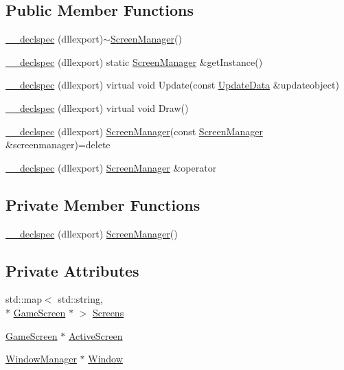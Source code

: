 \subsection*{Public Member Functions}
\begin{DoxyCompactItemize}
\item 
\hyperlink{class_screen_manager_ab348f37f1c0e6324ce57c4fbd3ec7472}{\-\_\-\-\_\-declspec} (dllexport)$\sim$\hyperlink{class_screen_manager}{Screen\-Manager}()
\item 
\hyperlink{class_screen_manager_a4c3f75679b3012b277a7d27413976ddd}{\-\_\-\-\_\-declspec} (dllexport) static \hyperlink{class_screen_manager}{Screen\-Manager} \&get\-Instance()
\item 
\hyperlink{class_screen_manager_a35e85f470e82fa773c250b1e67d1ad1b}{\-\_\-\-\_\-declspec} (dllexport) virtual void Update(const \hyperlink{class_update_data}{Update\-Data} \&updateobject)
\item 
\hyperlink{class_screen_manager_a21d7d26d0b547930bc87e3f4beb3c64c}{\-\_\-\-\_\-declspec} (dllexport) virtual void Draw()
\item 
\hyperlink{class_screen_manager_aa58378c4491afb6d72f4bc0b5090515f}{\-\_\-\-\_\-declspec} (dllexport) \hyperlink{class_screen_manager}{Screen\-Manager}(const \hyperlink{class_screen_manager}{Screen\-Manager} \&screenmanager)=delete
\item 
\hyperlink{class_screen_manager_a9b42f78484e20d582fdffba182ba3763}{\-\_\-\-\_\-declspec} (dllexport) \hyperlink{class_screen_manager}{Screen\-Manager} \&operator
\end{DoxyCompactItemize}
\subsection*{Private Member Functions}
\begin{DoxyCompactItemize}
\item 
\hyperlink{class_screen_manager_aaa33dec76e404bd739a754c80c4917cc}{\-\_\-\-\_\-declspec} (dllexport) \hyperlink{class_screen_manager}{Screen\-Manager}()
\end{DoxyCompactItemize}
\subsection*{Private Attributes}
\begin{DoxyCompactItemize}
\item 
std\-::map$<$ std\-::string, \\*
\hyperlink{class_game_screen}{Game\-Screen} $\ast$ $>$ \hyperlink{class_screen_manager_a54eb2c9667efda525a35d0d7043e8807}{Screens}
\item 
\hyperlink{class_game_screen}{Game\-Screen} $\ast$ \hyperlink{class_screen_manager_abb46941be1b908a2b9d8053409e89597}{Active\-Screen}
\item 
\hyperlink{class_window_manager}{Window\-Manager} $\ast$ \hyperlink{class_screen_manager_a5fee528eafa1b2defad2a7c4bd6766aa}{Window}
\end{DoxyCompactItemize}


